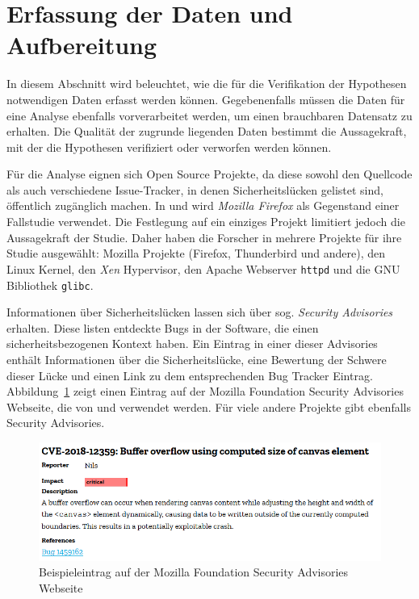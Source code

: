 \section{Erfassung der Daten und Aufbereitung}
\label{sec:erfassung}
In diesem Abschnitt wird beleuchtet, wie die für die Verifikation der Hypothesen notwendigen Daten erfasst werden können.
Gegebenenfalls müssen die Daten für eine Analyse ebenfalls vorverarbeitet werden, um einen brauchbaren Datensatz zu erhalten.
Die Qualität der zugrunde liegenden Daten bestimmt die Aussagekraft, mit der die Hypothesen verifiziert oder verworfen werden können.

Für die Analyse eignen sich Open Source Projekte,
da diese sowohl den Quellcode als auch verschiedene Issue-Tracker,
in denen Sicherheitslücken gelistet sind,
öffentlich zugänglich machen.
In \cite{chowdhury_zulkernine_2010} und \cite{chowdhury_zulkernine_2009} wird \emph{Mozilla Firefox} als Gegenstand einer Fallstudie verwendet.
Die Festlegung auf ein einziges Projekt limitiert jedoch die Aussagekraft der Studie.
Daher haben die Forscher in \cite{alves_et_al} mehrere Projekte für ihre Studie ausgewählt: 
Mozilla Projekte (Firefox, Thunderbird und andere),
den Linux Kernel,
den \emph{Xen} Hypervisor,
den Apache Webserver \texttt{httpd} und
die GNU Bibliothek \texttt{glibc}.

Informationen über Sicherheitslücken lassen sich über sog. \emph{Security Advisories} erhalten.
Diese listen entdeckte Bugs in der Software, die einen sicherheitsbezogenen Kontext haben.
Ein Eintrag in einer dieser Advisories enthält Informationen über die Sicherheitslücke, eine Bewertung der Schwere dieser Lücke und einen Link zu dem entsprechenden Bug Tracker Eintrag.
Abbildung~\ref{fig:mfsa} zeigt einen Eintrag auf der Mozilla Foundation Security Advisories Webseite, die von \cite{alves_et_al} und \cite{chowdhury_zulkernine_2010} verwendet werden.
Für viele andere Projekte gibt ebenfalls Security Advisories.
\begin{figure}
	\includegraphics[width=\textwidth]{img/mfsa_example.png}
	\caption{Beispieleintrag auf der Mozilla Foundation Security Advisories Webseite}
	\label{fig:mfsa}
\end{figure}

